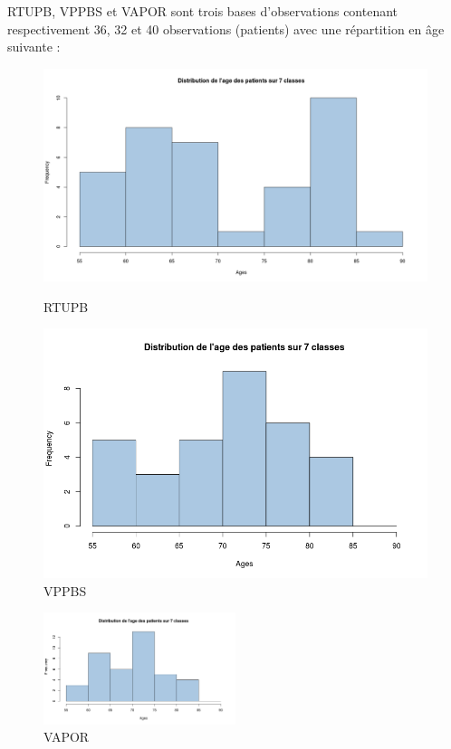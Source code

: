 %
%

RTUPB, VPPBS et VAPOR sont trois bases d'observations contenant respectivement 36, 32 et 40 observations (patients) avec une répartition en âge suivante : 

\begin{figure}[h]
    \begin{minipage}[c]{.46\linewidth}
        \centering
        \includegraphics[width=1\textwidth]{../Fig/RTUPB/rtupb-age-frequency}
        \caption{RTUPB}
    \end{minipage}
    \hfill%
    \begin{minipage}[c]{.46\linewidth}
        \centering
        \includegraphics[width=1\textwidth]{../Fig/VPPBS/vppbs-age-frequency.png}
        \caption{VPPBS}
    \end{minipage}
\end{figure}


\begin{figure}[H]
\centering
\includegraphics[width=0.50\textwidth]{../Fig/VAPOR/vapor-age-frequency}
\caption{VAPOR}
\end{figure}


%
